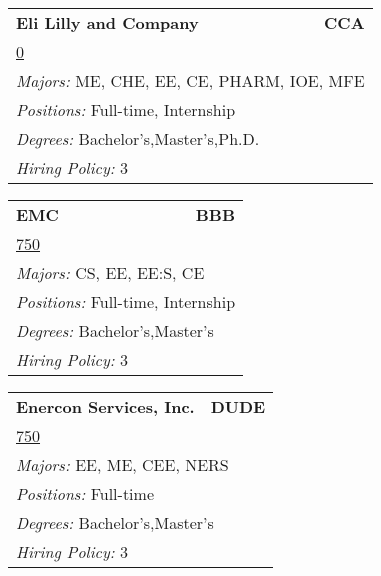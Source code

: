 \documentclass[twoside]{article}
\begin{document}
\begin{center}
\begin{multicols}{3}
\begin{FlushLeft}
\begin{minipage}{\columnwidth}\begin{tabularx}{.95\columnwidth}{Xr}
                 {\Large\bf Eli Lilly and Company} & {\Large\bf CCA}\\
    \multicolumn{2}{p{.95\columnwidth}}{\url{0}}\\
    \multicolumn{2}{p{.95\columnwidth}}{\emph{Majors:} ME, CHE, EE, CE, PHARM, IOE, MFE}\\
    \multicolumn{2}{p{.95\columnwidth}}{\emph{Positions:} Full-time, Internship}\\
    \multicolumn{2}{p{.95\columnwidth}}{\emph{Degrees:} Bachelor's,Master's,Ph.D.}\\
    \multicolumn{2}{p{.95\columnwidth}}{\emph{Hiring Policy:} 3}\\
    \end{tabularx}
    
\end{minipage}
 
\begin{minipage}{\columnwidth}\begin{tabularx}{.95\columnwidth}{Xr}
                 {\Large\bf EMC} & {\Large\bf BBB}\\
    \multicolumn{2}{p{.95\columnwidth}}{\url{750}}\\
    \multicolumn{2}{p{.95\columnwidth}}{\emph{Majors:} CS, EE, EE:S, CE}\\
    \multicolumn{2}{p{.95\columnwidth}}{\emph{Positions:} Full-time, Internship}\\
    \multicolumn{2}{p{.95\columnwidth}}{\emph{Degrees:} Bachelor's,Master's}\\
    \multicolumn{2}{p{.95\columnwidth}}{\emph{Hiring Policy:} 3}\\
    \end{tabularx}
    
\end{minipage}
 
\begin{minipage}{\columnwidth}\begin{tabularx}{.95\columnwidth}{Xr}
                 {\Large\bf Enercon Services, Inc.} & {\Large\bf DUDE}\\
    \multicolumn{2}{p{.95\columnwidth}}{\url{750}}\\
    \multicolumn{2}{p{.95\columnwidth}}{\emph{Majors:} EE, ME, CEE, NERS}\\
    \multicolumn{2}{p{.95\columnwidth}}{\emph{Positions:} Full-time}\\
    \multicolumn{2}{p{.95\columnwidth}}{\emph{Degrees:} Bachelor's,Master's}\\
    \multicolumn{2}{p{.95\columnwidth}}{\emph{Hiring Policy:} 3}\\
    \end{tabularx}
    

\end{minipage}
\end{FlushLeft}
\end{multicols}
\end{center}
\end{document}
